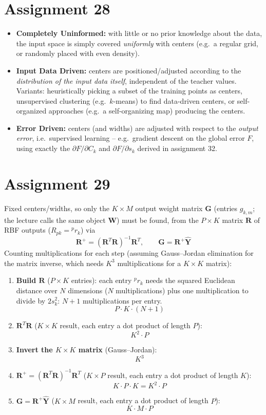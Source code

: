 \documentclass[11pt,a4paper]{article}
\begin{document}
\section*{Assignment 28}

\begin{itemize}
  \item \textbf{Completely Uninformed:} with little or no prior knowledge about the data, the
  input space is simply covered \emph{uniformly} with centers (e.g.\ a regular grid, or randomly
  placed with even density).
  \item \textbf{Input Data Driven:} centers are positioned/adjusted according to the
  \emph{distribution of the input data itself}, independent of the teacher values. Variants:
  heuristically picking a subset of the training points as centers, unsupervised clustering
  (e.g.\ $k$-means) to find data-driven centers, or self-organized approaches (e.g.\ a
  self-organizing map) producing the centers.
  \item \textbf{Error Driven:} centers (and widths) are adjusted with respect to the
  \emph{output error}, i.e.\ supervised learning -- e.g.\ gradient descent on the global error $F$,
  using exactly the $\partial F/\partial C_k$ and $\partial F/\partial s_k$ derived in
  assignment 32.
\end{itemize}

\section*{Assignment 29}

Fixed centers/widths, so only the $K{\times}M$ output weight matrix $\mathbf G$ (entries
$g_{k,m}$; the lecture calls the same object $\mathbf W$) must be found, from the $P{\times}K$
matrix $\mathbf R$ of RBF outputs ($R_{pk}={}^pr_k$) via
\[
  \mathbf R^{+} = (\mathbf R^{T}\mathbf R)^{-1}\mathbf R^{T}, \qquad \mathbf G = \mathbf R^{+}\hat{\mathbf Y}
\]
Counting multiplications for each step (assuming Gauss--Jordan elimination for the matrix
inverse, which needs $K^3$ multiplications for a $K{\times}K$ matrix):

\begin{enumerate}
  \item \textbf{Build $\mathbf R$} ($P{\times}K$ entries): each entry ${}^pr_k$ needs the squared
  Euclidean distance over $N$ dimensions ($N$ multiplications) plus one multiplication to divide
  by $2s_k^2$: $N+1$ multiplications per entry.
  \[
    P\cdot K\cdot(N+1)
  \]
  \item \textbf{$\mathbf R^{T}\mathbf R$} ($K{\times}K$ result, each entry a dot product of length
  $P$):
  \[
    K^2\cdot P
  \]
  \item \textbf{Invert the $K{\times}K$ matrix} (Gauss--Jordan):
  \[
    K^3
  \]
  \item \textbf{$\mathbf R^{+}=(\mathbf R^{T}\mathbf R)^{-1}\mathbf R^{T}$} ($K{\times}P$ result,
  each entry a dot product of length $K$):
  \[
    K\cdot P\cdot K = K^2\cdot P
  \]
  \item \textbf{$\mathbf G=\mathbf R^{+}\hat{\mathbf Y}$} ($K{\times}M$ result, each entry a dot
  product of length $P$):
  \[
    K\cdot M\cdot P
  \]
\end{enumerate}
\end{document}
